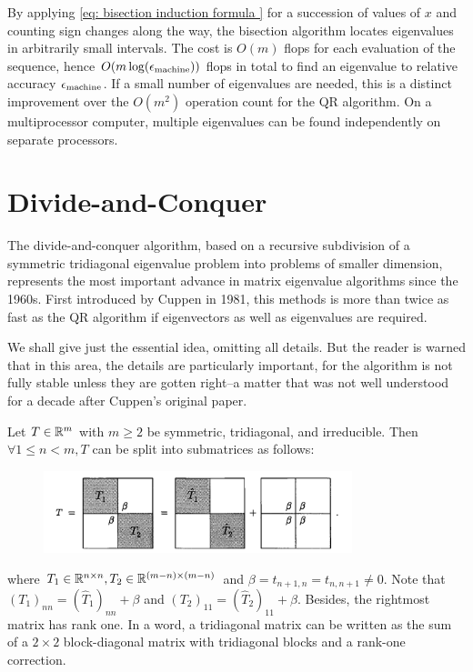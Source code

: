 By applying \eqref{eq: bisection induction formula } for a succession of values of $ x $ and counting sign changes along the way, the bisection algorithm locates eigenvalues in arbitrarily small intervals. The cost is $ O(m) $ flops for each evaluation of the sequence, hence $ O(m\log (\epsilon_{\text{machine}})) $ flops in total to find an eigenvalue to relative accuracy $ \epsilon_{\text{machine}} $. If a small number of eigenvalues are needed, this is a distinct improvement over the $ O(m^{2} ) $ operation count for the QR algorithm. On a multiprocessor computer, multiple eigenvalues can be found independently on separate processors. 


\section{Divide-and-Conquer} 
The divide-and-conquer algorithm, based on a recursive subdivision of a symmetric tridiagonal eigenvalue problem into problems of smaller dimension, represents the most important advance in matrix eigenvalue algorithms since the 1960s. First introduced by Cuppen in 1981, this methods is more than twice as fast as the QR algorithm if eigenvectors as well as eigenvalues are required.  

We shall give just the essential idea, omitting all details. But the reader is warned that in this area, the details are particularly important, for the algorithm is not fully stable unless they are gotten right--a matter that was not well understood for a decade after Cuppen's original paper. 

Let $ T\in \mathbb{R}^{m} $ with $ m\ge 2 $ be symmetric, tridiagonal, and irreducible. Then $ \forall 1\le n<m,T$ can be split into submatrices as follows: 
\begin{figure}[H]
    \centering
    \includegraphics[width=0.8\textwidth]{figures/30-2.png}
\end{figure}
where $ T_1 \in \mathbb{R}^{n\times n}, T_2 \in \mathbb{R}^{(m-n)\times (m-n)} $ and $\beta  = t_{n+1,n} = t_{n,n+1}\neq 0$.  Note that $(T_1)_{ nn } = (\hat T_1)_{nn} + \beta $ and $ (T_2)_{11} = ( \hat T_2 ) _{11} +\beta  $. Besides, the rightmost matrix has rank one.  In a word, a tridiagonal matrix can be written as the sum of a $ 2\times 2 $ block-diagonal matrix with tridiagonal blocks and a rank-one correction. 

